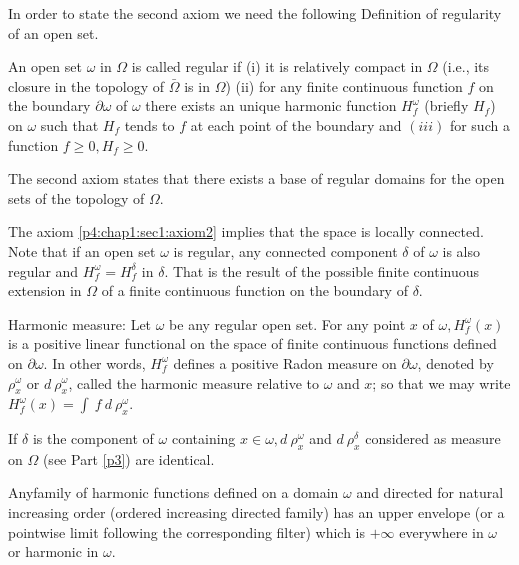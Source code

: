 In order to state the second axiom we need the following Definition of
regularity of an open set. 

\setcounter{defn}{0}
\begin{defn}\label{p4:chap1:sec1:def1}%
  An open set $\omega$ in $\Omega$ is called regular if 
  (i) it is relatively compact in $\Omega$ (i.e., its closure in the
  topology of $\bar{\Omega}$ is in $\Omega$) 
  (ii) for any finite continuous function $f$ on the boundary
  $\partial \omega$ of $\omega$ there exists an unique harmonic
  function $H^\omega_f$ (briefly $H_f$) on $\omega$ such that $H_f$
  tends to $f$ at each point of the boundary and 
  $(iii)$ for such a function $f \ge 0, H_f \ge 0$.
\end{defn}

\begin{Axiom}\label{p4:chap1:sec1:axiom2}%
  The second axiom states that there exists a base of regular domains
  for the open sets of the topology of $\Omega$. 
\end{Axiom}

The axiom \ref{p4:chap1:sec1:axiom2} implies that the space is
locally connected. Note that 
if an open set $\omega$ is regular, any connected component $\delta$
of $\omega$ is also regular and $H^\omega_f = H^\delta_f$ in
$\delta$. That is the result of the possible finite continuous
extension in $\Omega$ of a finite continuous function on the boundary
of $\delta$. 

\begin{defn}\label{p4:chap1:sec1:def2}%
  Harmonic measure: Let $\omega$ be any regular open set. For any
  point $x$ of $\omega, H^\omega_f (x)$ is a positive linear
  functional on the space of finite continuous functions defined on
  $\partial \omega$. In other words, $H^\omega_f$ defines a positive
  Radon measure on $\partial \omega$, denoted by $\rho^\omega_x$ or $d
  ~ \rho^\omega_x$, called the harmonic measure relative to $\omega$
  and $x$; so that we may write $H^\omega_f (x) = \int ~ f ~ d ~
  \rho^\omega_x$. 
\end{defn}

If $\delta$ is the component of $\omega$ containing $x \in \omega, d ~
\rho^\omega_x$ and $d ~ \rho^\delta_x$ considered as measure on
$\Omega$ (see Part \ref{p3}) are identical. 

\begin{Axiom}\label{p4:chap1:sec1:axiom3}%
  Any\pageoriginale family of harmonic functions defined on a domain $\omega$ and
  directed for natural increasing order (ordered increasing directed
  family) has an upper envelope (or a pointwise limit following the
  corresponding filter) which is $+ \infty$ everywhere in $\omega$ or
  harmonic in $\omega$. 
\end{Axiom}

